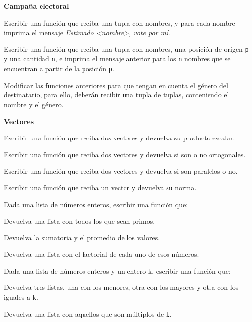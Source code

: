 \begin{ejercicio}{\bf Campaña electoral}
\begin{partes}
\item Escribir una función que reciba una tupla con nombres, y para cada
nombre imprima el mensaje \emph{Estimado <nombre>, vote por mí.}
\item Escribir una función que reciba una tupla con nombres, una posición
de origen \verb!p! y una cantidad \verb!n!, e imprima el mensaje anterior
para los \verb!n! nombres que se encuentran a partir de la posición
\verb!p!.
\item Modificar las funciones anteriores para que tengan en cuenta el
género del destinatario, para ello, deberán recibir una tupla de tuplas,
conteniendo el nombre y el género.
\end{partes}
\end{ejercicio}


\begin{ejercicio}
{\bf Vectores}
\begin{partes}
\item Escribir una función que reciba dos vectores y devuelva su producto
escalar.
\item Escribir una función que reciba dos vectores y devuelva si son o no
ortogonales.
\item Escribir una función que reciba dos vectores y devuelva si son
paralelos o no.
\item Escribir una función que reciba un vector y devuelva su norma.
\end{partes}
\end{ejercicio}


\begin{ejercicio}
Dada una lista de números enteros, escribir una función que:
\begin{partes}
\item Devuelva una lista con todos los que sean primos.
\item Devuelva la sumatoria y el promedio de los valores.
\item Devuelva una lista con el factorial de cada uno de esos números.
\end{partes}
\end{ejercicio}


\begin{ejercicio}
Dada una lista de números enteros y un entero k, escribir una función que:
\begin{partes}
\item Devuelva tres listas, una con los menores, otra con los mayores y
otra con los iguales a k.
\item Devuelva una lista con aquellos que son múltiplos de k.
\end{partes}
\end{ejercicio}


